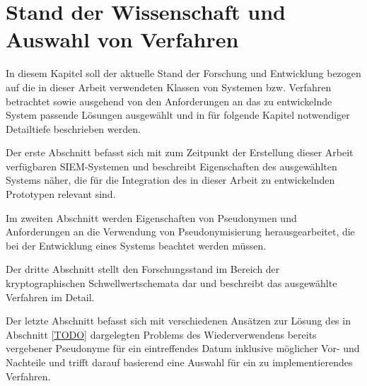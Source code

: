 \chapter{Stand der Wissenschaft und Auswahl von Verfahren}

\label{cha_state}

In diesem Kapitel soll der aktuelle Stand der Forschung und Entwicklung bezogen auf die in dieser Arbeit verwendeten Klassen von Systemen bzw. Verfahren betrachtet sowie ausgehend von den Anforderungen an das zu entwickelnde System passende Lösungen ausgewählt und in für folgende Kapitel notwendiger Detailtiefe beschrieben werden. 

Der erste Abschnitt befasst sich mit zum Zeitpunkt der Erstellung dieser Arbeit verfügbaren SIEM-Systemen und beschreibt Eigenschaften des ausgewählten Systems näher, die für die Integration des in dieser Arbeit zu entwickelnden Prototypen relevant sind.

Im zweiten Abschnitt werden Eigenschaften von Pseudonymen und Anforderungen an die Verwendung von Pseudonymisierung herausgearbeitet, die bei der Entwicklung eines Systems beachtet werden müssen.

Der dritte Abschnitt stellt den Forschungsstand im Bereich der kryptographischen Schwellwertschemata dar und beschreibt das ausgewählte Verfahren im Detail.

Der letzte Abschnitt befasst sich mit verschiedenen Ansätzen zur Lösung des in Abschnitt \ref{TODO} dargelegten Problems des Wiederverwendens bereits vergebener Pseudonyme für ein eintreffendes Datum inklusive möglicher Vor- und Nachteile und trifft darauf basierend eine Auswahl für ein zu implementierendes Verfahren. 







